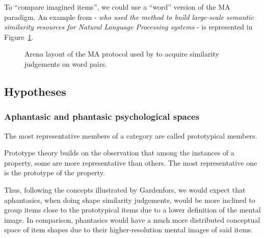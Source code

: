 \documentclass[
  authoryear]{elsarticle}
\begin{document}
To ``compare imagined items'', we could use a ``word'' version of the MA
paradigm. An example from
\citet{majewskaSpatialMultiarrangementClustering2020} - \emph{who used
the method to build large-scale semantic similarity resources for
Natural Language Processing systems} - is represented in
Figure~\ref{fig-majewska}.

\begin{figure}


\caption{\label{fig-majewska}Arena layout of the MA protocol used by
\citet{majewskaSpatialMultiarrangementClustering2020} to acquire
similarity judgements on word pairs.}

\end{figure}%

\subsection{Hypotheses}\label{hypotheses}

\subsubsection{Aphantasic and phantasic psychological
spaces}\label{aphantasic-and-phantasic-psychological-spaces}

The most representative members of a category are called prototypical
members.

Prototype theory builds on the observation that among the instances of a
property, some are more representative than others. The most
representative one is the prototype of the property.

Thus, following the concepts illustrated by Gardenfors, we would expect
that aphantasics, when doing shape similarity judgements, would be more
inclined to group items close to the prototypical items due to a lower
definition of the mental image. In comparison, phantasics would have a
much more distributed conceptual space of item shapes due to their
higher-resolution mental images of said items.
\end{document}
